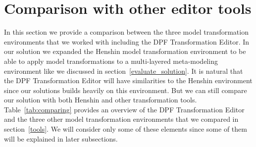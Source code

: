 
\section{Comparison with other editor tools}

In this section we provide a comparison between the three model
transformation environments that we worked with including the DPF Transformation
Editor. In our solution we expanded the Henshin model transformation environment
to be able to apply model transformations to a multi-layered meta-modeling
environment like we discussed in section~\ref{evaluate_solution}. It is natural
that the DPF Transformation Editor will have similarities to the Henshin environment
since our solutions builds heavily on this environment. But we can still
compare our solution with both Henshin and other transformation tools.
Table~\ref{tab:comparing} provides an overview of the DPF Transformation Editor
and the three other model transformation environments that we compared in
section~\ref{tools}. We will consider only some of these elements since some of
them will be explained in later subsections. 


